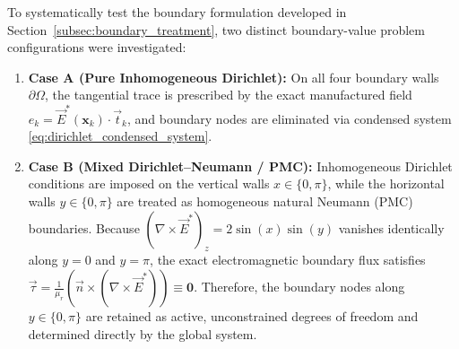 \documentclass[VANCOUVER,Times1COL]{WileyNJD-v5}
\begin{document}
To systematically test the boundary formulation developed in Section~\ref{subsec:boundary_treatment}, two distinct boundary-value problem configurations were investigated:
\begin{enumerate}
    \item \textbf{Case A (Pure Inhomogeneous Dirichlet):} On all four boundary walls $\partial\Omega$, the tangential trace is prescribed by the exact manufactured field $e_k = \vec{E}^*(\mathbf{x}_k) \cdot \vec{t}_k$, and boundary nodes are eliminated via condensed system \eqref{eq:dirichlet_condensed_system}.
    \item \textbf{Case B (Mixed Dirichlet--Neumann / PMC):} Inhomogeneous Dirichlet conditions are imposed on the vertical walls $x \in \{0, \pi\}$, while the horizontal walls $y \in \{0, \pi\}$ are treated as homogeneous natural Neumann (PMC) boundaries. Because $(\nabla \times \vec{E}^*)_z = 2\sin(x)\sin(y)$ vanishes identically along $y=0$ and $y=\pi$, the exact electromagnetic boundary flux satisfies $\vec{\tau} = \frac{1}{\mu_r} (\vec{n} \times (\nabla \times \vec{E}^*)) \equiv \mathbf{0}$. Therefore, the boundary nodes along $y \in \{0, \pi\}$ are retained as active, unconstrained degrees of freedom and determined directly by the global system.
\end{enumerate}
\end{document}
